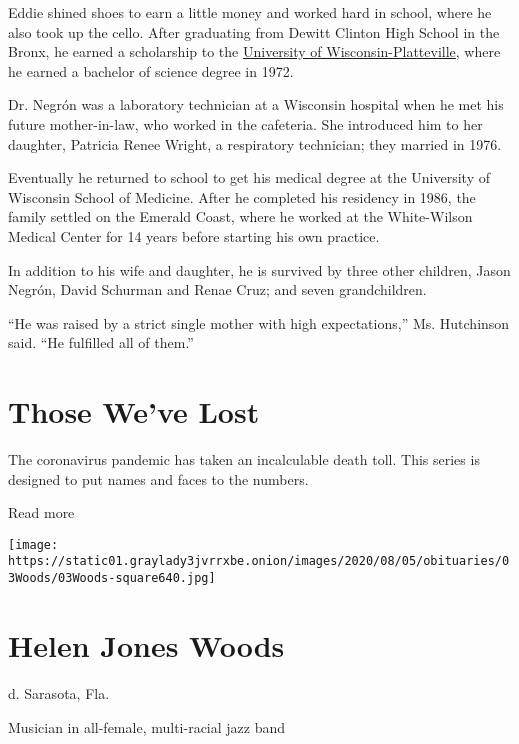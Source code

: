 Eddie shined shoes to earn a little money and worked hard in school,
where he also took up the cello. After graduating from Dewitt Clinton
High School in the Bronx, he earned a scholarship to the
\href{https://www.uwplatt.edu/}{University of Wisconsin-Platteville},
where he earned a bachelor of science degree in 1972.

Dr. Negrón was a laboratory technician at a Wisconsin hospital when he
met his future mother-in-law, who worked in the cafeteria. She
introduced him to her daughter, Patricia Renee Wright, a respiratory
technician; they married in 1976.

Eventually he returned to school to get his medical degree at the
University of Wisconsin School of Medicine. After he completed his
residency in 1986, the family settled on the Emerald Coast, where he
worked at the White-Wilson Medical Center for 14 years before starting
his own practice.

In addition to his wife and daughter, he is survived by three other
children, Jason Negrón, David Schurman and Renae Cruz; and seven
grandchildren.

``He was raised by a strict single mother with high expectations,'' Ms.
Hutchinson said. ``He fulfilled all of them.''

\href{https://www.nytimes3xbfgragh.onion/interactive/2020/obituaries/people-died-coronavirus-obituaries.html?action=click\&pgtype=Article\&state=default\&region=BELOW_MAIN_CONTENT\&context=covid_obits_promo}{}

\hypertarget{those-weve-lost}{%
\section{Those We've Lost}\label{those-weve-lost}}

The coronavirus pandemic has taken an incalculable death toll. This
series is designed to put names and faces to the numbers.

Read more

\texttt{[image: https://static01.graylady3jvrrxbe.onion/images/2020/08/05/obituaries/03Woods/03Woods-square640.jpg]}

\hypertarget{helen-jones-woods}{%
\section{Helen Jones Woods}\label{helen-jones-woods}}

d. Sarasota, Fla.

Musician in all-female, multi-racial jazz band

